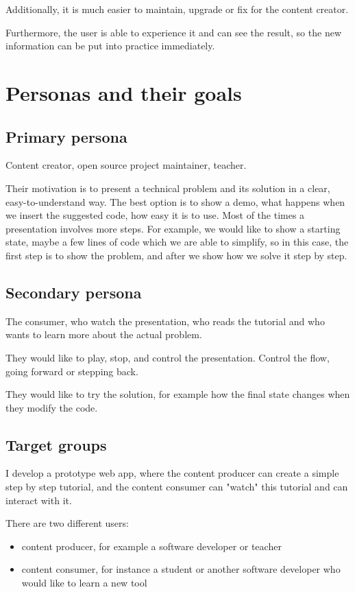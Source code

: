 \documentclass[11pt, a4paper, oneside, openright, medskipamount]{report}
\begin{document}
Additionally, it is much easier to maintain, upgrade or fix for the content creator.

Furthermore, the user is able to experience it and can see the result, so the new information can be put into practice immediately.

\section{Personas and their goals}

\subsection{Primary persona}

Content creator, open source project maintainer, teacher.

Their motivation is to present a technical problem and its solution in a clear, easy-to-understand way. The best option is to show a demo, what happens when we insert the suggested code, how easy it is to use. Most of the times a presentation involves more steps. For example, we would like to show a starting state, maybe a few lines of code which we are able to simplify, so in this case, the first step is to show the problem, and after we show how we solve it step by step.

\subsection{Secondary persona}

The consumer, who watch the presentation, who reads the tutorial and who wants to learn more about the actual problem.

They would like to play, stop, and control the presentation. Control the flow, going forward or stepping back.

They would like to try the solution, for example how the final state changes when they modify the code.

\subsection{Target groups}

I develop a prototype web app, where the content producer can create a simple step by step tutorial, and the content consumer can "watch" this tutorial and can interact with it.

There are two different users:
\begin{itemize}[noitemsep]
\item content producer, for example a software developer or teacher
\item content consumer, for instance a student or another software developer who would like to learn a new tool
\end{itemize}
\end{document}
